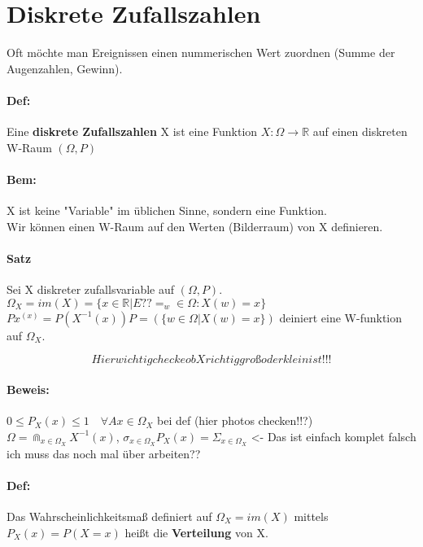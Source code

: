 \documentclass{article}
\begin{document}
\section*{Diskrete Zufallszahlen}
Oft möchte man Ereignissen einen nummerischen Wert zuordnen (Summe der Augenzahlen, Gewinn). 

\paragraph*{Def:} Eine \textbf{diskrete Zufallszahlen} X ist eine Funktion \(X: \Omega \to \mathbb{R}\) auf einen diskreten W-Raum \((\Omega, P)\)

\paragraph*{Bem:} X ist keine "Variable" im üblichen Sinne, sondern eine Funktion. \\

Wir können einen W-Raum auf den Werten (Bilderraum) von X definieren. 

\paragraph*{Satz} Sei X diskreter zufallsvariable auf \((\Omega, P)\). \\ \(\Omega_{X} = im(X) = \{x \in \mathbb{R} \vert E??=_w \in \Omega : X(w) = x\}\) \(Px^{(x)} = P(X^{-1}(x)) P= (\{w \in \Omega \vert X(w) = x \})\) deiniert eine W-funktion auf \(\Omega_X\).

\[Hier wichtig checke ob X richtig groß oder klein ist!!!\]

\paragraph*{Beweis:} \(0 \leq P_X(x) \leq 1 \quad \forall Ax\in \Omega_X \) bei def (hier photos checken!!?) \\ \(\Omega = \Cap_{x \in \Omega_X} X^{-1}(x)\), \(\sigma_{x \in \Omega_X} P_X(x) = \Sigma_{x \in \Omega_X}\) <- Das ist einfach komplet falsch ich muss das noch mal über arbeiten??

\paragraph*{Def:} Das Wahrscheinlichkeitsmaß definiert auf \(\Omega_X = im(X)\) mittels \(P_X(x) = P(X = x)\) heißt die \textbf{Verteilung} von X.
\end{document}
